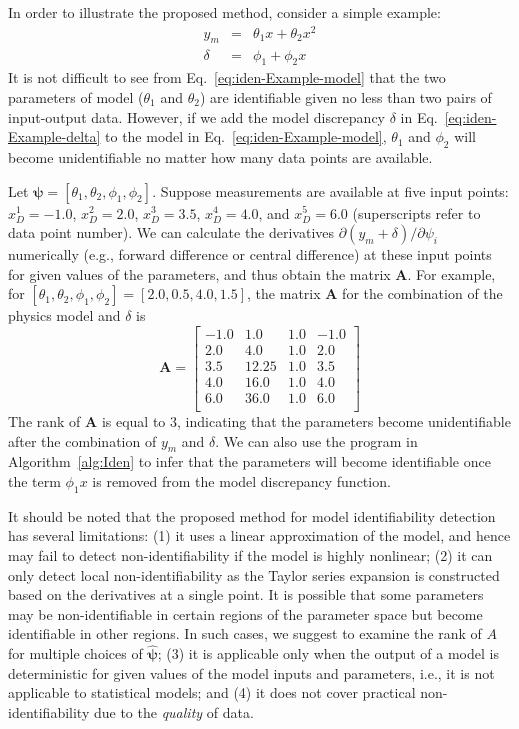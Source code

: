 \documentclass[preprint,review,12pt,3p]{elsarticle}
\begin{document}
In order to illustrate the proposed method, consider a simple example:
\begin{eqnarray}
y_m &=& \theta_1 x+ \theta_2 x^2 \label{eq:iden-Example-model}\\
\delta &=& \phi_1+\phi_2 x \label{eq:iden-Example-delta}
\end{eqnarray}
It is not difficult to see from Eq.~\ref{eq:iden-Example-model} that the two parameters of model ($\theta_1$ and $\theta_2$) are identifiable given no less than two pairs of input-output data. However, if we add the model discrepancy $\delta$ in Eq.~\ref{eq:iden-Example-delta} to the model in Eq.~\ref{eq:iden-Example-model}, $\theta_1$ and $\phi_2$ will become unidentifiable no matter how many data points are available.

Let $\boldsymbol{\psi}=[\theta_1, \theta_2, \phi_1, \phi_2]$. Suppose measurements are available at five input points: $x^1_D=-1.0$, $x^2_D=2.0$, $x^3_D=3.5$, $x^4_D=4.0$, and $x^5_D=6.0$ (superscripts refer to data point number). We can calculate the derivatives $\partial (y_m+\delta)/\partial \psi_i$ numerically (e.g., forward difference or central difference) at these input points for given values of the parameters, and thus obtain the matrix $\boldsymbol{A}$. For example, for $[\theta_1, \theta_2, \phi_1, \phi_2]=[2.0, 0.5, 4.0, 1.5]$, the matrix $\boldsymbol{A}$ for the combination of the physics model and $\delta$ is
\begin{equation*}
\boldsymbol{A} = \begin{bmatrix}
 -1.0  &   1.0  &   1.0 &  -1.0  \\
  2.0  &   4.0 &  1.0  &   2.0  \\
  3.5 &  12.25 &   1.0  &   3.5 \\
  4.0  &  16.0 &   1.0  &   4.0  \\
  6.0  &  36.0 &   1.0  &   6.0 \\
\end{bmatrix}
\end{equation*}
The rank of $\boldsymbol{A}$ is equal to 3, indicating that the parameters become unidentifiable after the combination of $y_m$ and $\delta$. We can also use the program in Algorithm~\ref{alg:Iden} to infer that the parameters will become identifiable once the term $\phi_1 x$ is removed from the model discrepancy function.

It should be noted that the proposed method for model identifiability detection has several limitations: (1) it uses a linear approximation of the model, and hence may fail to detect non-identifiability if the model is highly nonlinear; (2) it can only detect local non-identifiability as the Taylor series expansion is constructed based on the derivatives at a single point. It is possible that some parameters may be non-identifiable in certain regions of the parameter space but become identifiable in other regions. In such cases, we suggest to examine the rank of $A$ for multiple choices of $\hat{\boldsymbol{\psi}}$; (3) it is applicable only when the output of a model is deterministic for given values of the model inputs and parameters, i.e., it is not applicable to statistical models; and (4) it does not cover practical non-identifiability due to the \textit{quality} of data. 
\end{document}
